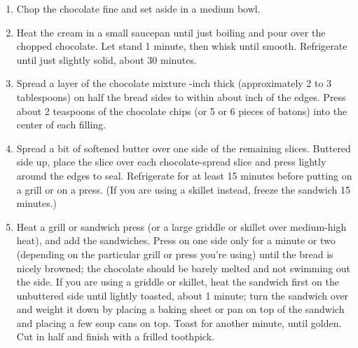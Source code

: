 \prep{}

\begin{ingredients}
\end{ingredients}


\begin{recipe}
  \begin{enumerate}
  \item Chop the chocolate
    fine and set aside in a medium bowl.

\item Heat the cream in a small saucepan until just boiling
and pour over the chopped chocolate. Let stand 1 minute,
then whisk until smooth. Refrigerate until just slightly
solid, about 30 minutes.

\item Spread a layer of the chocolate mixture \fracQ-inch thick
(approximately 2 to 3 tablespoons) on half the bread sides
to within about \fracQ inch of the edges. Press about 2
teaspoons of the chocolate chips (or 5 or 6 pieces of
batons) into the center of each filling.

\item Spread a bit of softened butter over one side of the
remaining slices. Buttered side up, place the slice over   
each chocolate-spread slice and press lightly around the   
edges to seal. Refrigerate for at least 15 minutes before
putting on a grill or on a press. (If you are using a
skillet instead, freeze the sandwich 15 minutes.)

\item Heat a grill or sandwich press (or a large griddle or
skillet over medium-high heat), and add the sandwiches.
Press on one side only for a minute or two (depending on   
the particular grill or press you're using) until the bread
is nicely browned; the chocolate should be barely melted
and not swimming out the side. If you are using a griddle
or skillet, heat the sandwich first on the unbuttered side
until lightly toasted, about 1 minute; turn the sandwich
over and weight it down by placing a baking sheet or pan on
top of the sandwich and placing a few soup cans on top.
Toast for another minute, until golden. Cut in half and
finish with a frilled toothpick.



  \end{enumerate}
\end{recipe}

